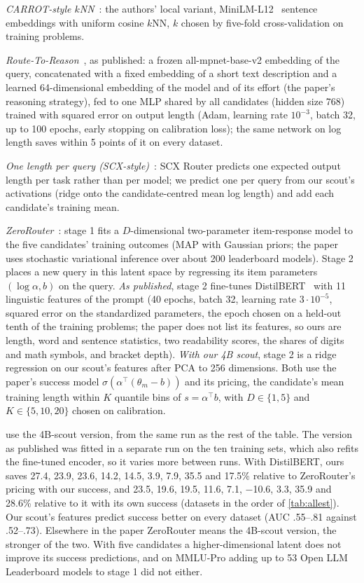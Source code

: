 \documentclass[10pt]{article}
\begin{document}
\emph{CARROT-style $k$NN}~\citep{carrot}: the authors' local variant, MiniLM-L12~\citep{minilm} sentence embeddings with uniform cosine $k$NN, $k$ chosen by five-fold cross-validation on training problems.

\emph{Route-To-Reason}~\citep{routetoreason}, as published: a frozen all-mpnet-base-v2 embedding of the query, concatenated with a fixed embedding of a short text description and a learned 64-dimensional embedding of the model and of its effort (the paper's reasoning strategy), fed to one MLP shared by all candidates (hidden size 768) trained with squared error on output length (Adam, learning rate $10^{-3}$, batch 32, up to 100 epochs, early stopping on calibration loss); the same network on log length saves within 5 points of it on every dataset.

\emph{One length per query (SCX-style)}~\citep{scx}: SCX Router predicts one expected output length per task rather than per model; we predict one per query from our scout's activations (ridge onto the candidate-centred mean log length) and add each candidate's training mean.

\emph{ZeroRouter}~\citep{zerorouter}: stage 1 fits a $D$-dimensional two-parameter item-response model to the five candidates' training outcomes (MAP with Gaussian priors; the paper uses stochastic variational inference over about 200 leaderboard models). Stage 2 places a new query in this latent space by regressing its item parameters $(\log\alpha, b)$ on the query. \emph{As published}, stage 2 fine-tunes DistilBERT~\citep{distilbert} with 11 linguistic features of the prompt (40 epochs, batch 32, learning rate $3\cdot10^{-5}$, squared error on the standardized parameters, the epoch chosen on a held-out tenth of the training problems; the paper does not list its features, so ours are length, word and sentence statistics, two readability scores, the shares of digits and math symbols, and bracket depth). \emph{With our 4B scout}, stage 2 is a ridge regression on our scout's features after PCA to 256 dimensions. Both use the paper's success model $\sigma(\alpha^\top(\theta_m-b))$ and its pricing, the candidate's mean training length within $K$ quantile bins of $s=\alpha^\top b$, with $D\in\{1,5\}$ and $K\in\{5,10,20\}$ chosen on calibration.

 use the 4B-scout version, from the same run as the rest of the table. The version as published was fitted in a separate run on the ten training sets, which also refits the fine-tuned encoder, so it varies more between runs. With DistilBERT, ours saves 27.4, 23.9, 23.6, 14.2, 14.5, 3.9, 7.9, 35.5 and 17.5\% relative to ZeroRouter's pricing with our success, and 23.5, 19.6, 19.5, 11.6, 7.1, $-$10.6, 3.3, 35.9 and 28.6\% relative to it with its own success (datasets in the order of \cref{tab:allest}). Our scout's features predict success better on every dataset (AUC .55--.81 against .52--.73). Elsewhere in the paper ZeroRouter means the 4B-scout version, the stronger of the two. With five candidates a higher-dimensional latent does not improve its success predictions, and on MMLU-Pro adding up to 53 Open LLM Leaderboard models to stage 1 did not either.
\end{document}
